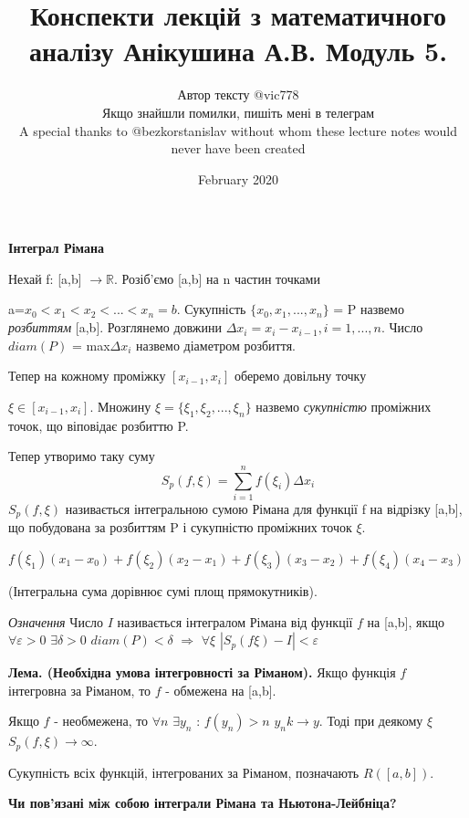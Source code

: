 \documentclass[12pt]{report}
\title{Конспекти лекцій з математичного аналізу Анікушина А.В. Модуль 5.}
\author{Автор тексту @vic778 \\ Якщо знайшли помилки, пишіть мені в телеграм \\  \small{A special thanks to @bezkorstanislav without whom these lecture notes would never have been created}}
\date{February 2020}
\begin{document}
	\maketitle
	
	\begin{center}
		\textbf{\Large Інтеграл Рімана} 
	\end{center}
	
	Нехай f: [a,b]	$\rightarrow \mathbb{R}$. Розіб'ємо [a,b] на n частин точками 
	
	a=$x_0<x_1<x_2<...<x_n=b$. Сукупність  $\{x_0, x_1, ..., x_n\}$ = P назвемо \textit{ розбиттям} [a,b]. Розглянемо довжини $\Delta x_i = x_i - x_{i-1},     i = 1, ..., n.$
	Число $\textit{diam} (P)$ = max$ \Delta x_i$ назвемо $\textit{діаметром}$ розбиття.
	
	Тепер на кожному проміжку $[x_{i-1}, x_i]$ оберемо довільну точку  
	
	$\xi \in [x_{i-1}, x_i]$. Множину $\xi = \{\xi_1, \xi_2, ..., \xi_n\}$ назвемо  \textit{сукупністю} проміжних точок, що віповідає розбиттю P. 
	
	Тепер утворимо таку суму \[  S_p (f, \xi)  = \sum\limits_{i=1}^n f(\xi_i)\Delta x_i \]
	$ S_p (f, \xi)   $ називається інтегральною сумою Рімана для функції f на відрізку [a,b], що побудована за розбиттям P і сукупністю проміжних точок $ \xi $.
	
	$ f(\xi_1)(x_1 - x_0)+ f(\xi_2)(x_2 - x_1)+ f(\xi_3)(x_3 - x_2) +f(\xi_4)(x_4- x_3) $ 
	
	(Інтегральна сума дорівнює сумі площ прямокутників).
	
	\textit{Означення} Число $I$ називається $\textit{інтегралом Рімана} $ від функції  $ f $
	на [a,b], якщо $ \forall \varepsilon > 0 $   $ \exists \delta > 0$   $ diam (P) < \delta$ $\Rightarrow  $ $ \forall \xi $ $ |S_p(f\xi) - I|  < \varepsilon$
	
	\vspace{5 mm} 
	
	\textbf{Лема. (Необхідна умова інтегровності за Ріманом).} Якщо функція $ f $ інтегровна за Ріманом, то $ f $ - обмежена на [a,b].
	
	Якщо $ f $ - необмежена, то $ \forall n $  $ \exists y_n $ : $ f(y_n) > n$ $ y_nk \rightarrow y $. Тоді при деякому $ \xi $ $ S_p (f, \xi)  \rightarrow \infty$.
	
	\vspace{5 mm} 
	Сукупність всіх функцій, інтегрованих за Ріманом, позначають $ R([a,b]) $.
	
	\begin{center}
		\textbf{\Large Чи пов'язані між собою інтеграли Рімана та Ньютона-Лейбніца?} 
	\end{center}
	
\end{document}
